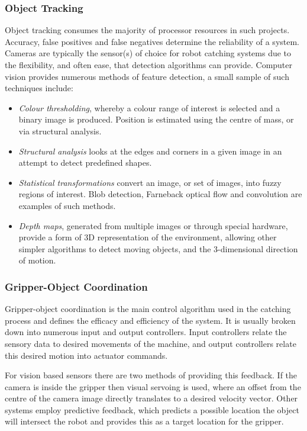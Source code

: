 \documentclass[conference]{IEEEtran}
\begin{document}
\subsubsection{Object Tracking}
Object tracking consumes the majority of processor resources in such projects. Accuracy, false positives and false negatives determine the reliability of a system. Cameras are typically the sensor(s) of choice for robot catching systems due to the flexibility, and often ease, that detection algorithms can provide. Computer vision provides numerous methods of feature detection, a small sample of such techniques include:
\begin{itemize}
\item \textit{Colour thresholding}, whereby a colour range of interest is selected and a binary image is produced. Position is estimated using the centre of mass, or via structural analysis.
\item \textit{Structural analysis} looks at the edges and corners in a given image in an attempt to detect predefined shapes.
\item \textit{Statistical transformations} convert an image, or set of images, into fuzzy regions of interest. Blob detection, Farneback optical flow and convolution are examples of such methods.
\item \textit{Depth maps}, generated from multiple images or through special hardware, provide a form of 3D representation of the environment, allowing other simpler algorithms to detect moving objects, and the 3-dimensional direction of motion.
\end{itemize}
\subsubsection{Gripper-Object Coordination}
Gripper-object coordination is the main control algorithm used in the catching process and defines the efficacy and efficiency of the system. It is usually broken down into numerous input and output controllers. Input controllers relate the sensory data to desired movements of the machine, and output controllers relate this desired motion into actuator commands.

For vision based sensors there are two methods of providing this feedback. If the camera is inside the gripper then visual servoing is used, where an offset from the centre of the camera image directly translates to a desired velocity vector. Other systems employ predictive feedback, which predicts a possible location the object will intersect the robot and provides this as a target location for the gripper.
\end{document}
